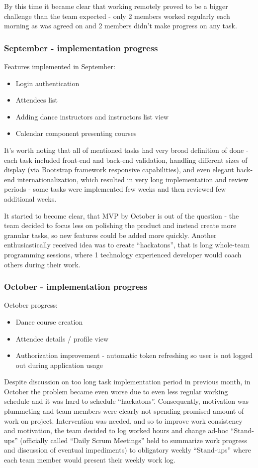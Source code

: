 \documentclass{article}
\begin{document}
By this time it became clear that working remotely proved to be a bigger challenge than the team expected - only 2 members worked regularly each morning as was agreed on and 2 members didn't make progress on any task.

\subsubsection{September - implementation progress}
Features implemented in September:
\begin{itemize}
\item Login authentication
\item Attendees list
\item Adding dance instructors and instructors list view
\item Calendar component presenting courses
\end{itemize}
It's worth noting that all of mentioned tasks had very broad definition of done - each task included front-end and back-end validation, handling different sizes of display (via Bootstrap framework responsive capabilities), and even elegant back-end internationalization, which resulted in very long implementation and review periods - some tasks were implemented few weeks and then reviewed few additional weeks.

It started to become clear, that MVP by October is out of the question - the team decided to focus less on polishing the product and instead create more granular tasks, so new features could be added more quickly. Another enthusiastically received idea was to create ``hackatons'', that is long whole-team programming sessions, where 1 technology experienced developer would coach others during their work.

\subsubsection{October - implementation progress}
October progress:
\begin{itemize}
\item Dance course creation
\item Attendee details / profile view
\item Authorization improvement - automatic token refreshing so user is not logged out during application usage
\end{itemize}

Despite discussion on too long task implementation period in previous month, in October the problem became even worse due to even less regular working schedule and it was hard to schedule ``hackatons''. Consequently, motivation was plummeting and team members were clearly not spending promised amount of work on project. Intervention was needed, and so to improve work consistency and motivation, the team decided to log worked hours and change ad-hoc ``Stand-ups'' (officially called ``Daily Scrum Meetings'' held to summarize work progress and discussion of eventual impediments) to obligatory weekly ``Stand-ups'' where each team member would present their weekly work log.
\end{document}
